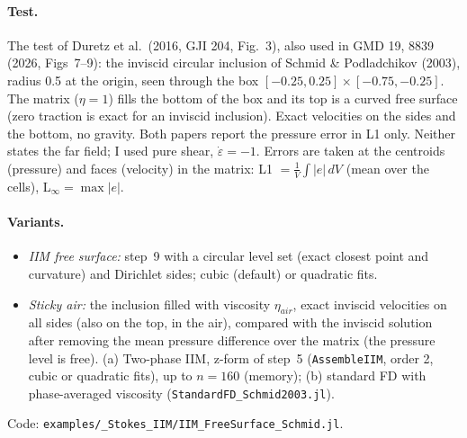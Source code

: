\documentclass[11pt,a4paper]{article}
\newcommand{\code}[1]{\texttt{#1}}
\begin{document}
\paragraph{Test.} The test of Duretz et al.\ (2016, GJI 204, Fig.~3), also used in GMD 19,
8839 (2026, Figs~7--9): the inviscid circular inclusion of Schmid \& Podladchikov (2003),
radius 0.5 at the origin, seen through the box $[-0.25,0.25]\times[-0.75,-0.25]$. The matrix
($\eta=1$) fills the bottom of the box and its top is a curved free surface (zero traction is
exact for an inviscid inclusion). Exact velocities on the sides and the bottom, no gravity. Both
papers report the pressure error in L1 only. Neither states the far field; I used pure shear,
$\dot\varepsilon=-1$. Errors are taken at the centroids (pressure) and faces (velocity) in the
matrix: L1 $=\frac1V\int|e|\,dV$ (mean over the cells), L$_\infty=\max|e|$.

\paragraph{Variants.}
\begin{itemize}
  \item \emph{IIM free surface:} step~9 with a circular level set (exact closest point and
    curvature) and Dirichlet sides; cubic (default) or quadratic fits.
  \item \emph{Sticky air:} the inclusion filled with viscosity $\eta_{air}$, exact inviscid
    velocities on all sides (also on the top, in the air), compared with the inviscid solution
    after removing the mean pressure difference over the matrix (the pressure level is free).
    (a) Two-phase IIM, z-form of step~5 (\code{AssembleIIM}, order 2, cubic or quadratic fits),
    up to $n=160$ (memory); (b) standard FD with phase-averaged viscosity
    (\code{StandardFD\_Schmid2003.jl}).
\end{itemize}
Code: \code{examples/\allowbreak \_Stokes\_IIM/\allowbreak IIM\_FreeSurface\_Schmid.jl}.
\end{document}
